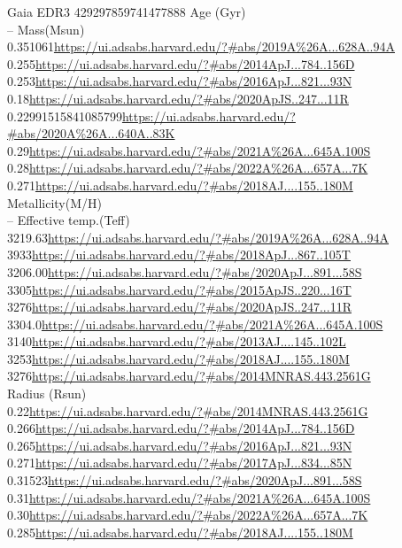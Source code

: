 Gaia EDR3 429297859741477888
Age (Gyr)\\
--
Mass(Msun)\\
0.351061\url{https://ui.adsabs.harvard.edu/?#abs/2019A%26A...628A..94A}\\
0.255\url{https://ui.adsabs.harvard.edu/?#abs/2014ApJ...784..156D}\\
0.253\url{https://ui.adsabs.harvard.edu/?#abs/2016ApJ...821...93N}\\
0.18\url{https://ui.adsabs.harvard.edu/?#abs/2020ApJS..247...11R}\\
0.22991515841085799\url{https://ui.adsabs.harvard.edu/?#abs/2020A%26A...640A..83K}\\
0.29\url{https://ui.adsabs.harvard.edu/?#abs/2021A%26A...645A.100S}\\
0.28\url{https://ui.adsabs.harvard.edu/?#abs/2022A%26A...657A...7K}\\
0.271\url{https://ui.adsabs.harvard.edu/?#abs/2018AJ....155..180M}\\
Metallicity(M/H)\\
--
Effective temp.(Teff)\\
3219.63\url{https://ui.adsabs.harvard.edu/?#abs/2019A%26A...628A..94A}\\
3933\url{https://ui.adsabs.harvard.edu/?#abs/2018ApJ...867..105T}\\
3206.00\url{https://ui.adsabs.harvard.edu/?#abs/2020ApJ...891...58S}\\
3305\url{https://ui.adsabs.harvard.edu/?#abs/2015ApJS..220...16T}\\
3276\url{https://ui.adsabs.harvard.edu/?#abs/2020ApJS..247...11R}\\
3304.0\url{https://ui.adsabs.harvard.edu/?#abs/2021A%26A...645A.100S}\\
3140\url{https://ui.adsabs.harvard.edu/?#abs/2013AJ....145..102L}\\
3253\url{https://ui.adsabs.harvard.edu/?#abs/2018AJ....155..180M}\\
3276\url{https://ui.adsabs.harvard.edu/?#abs/2014MNRAS.443.2561G}\\
Radius (Rsun)\\
0.22\url{https://ui.adsabs.harvard.edu/?#abs/2014MNRAS.443.2561G}\\
0.266\url{https://ui.adsabs.harvard.edu/?#abs/2014ApJ...784..156D}\\
0.265\url{https://ui.adsabs.harvard.edu/?#abs/2016ApJ...821...93N}\\
0.271\url{https://ui.adsabs.harvard.edu/?#abs/2017ApJ...834...85N}\\
0.31523\url{https://ui.adsabs.harvard.edu/?#abs/2020ApJ...891...58S}\\
0.31\url{https://ui.adsabs.harvard.edu/?#abs/2021A%26A...645A.100S}\\
0.30\url{https://ui.adsabs.harvard.edu/?#abs/2022A%26A...657A...7K}\\
0.285\url{https://ui.adsabs.harvard.edu/?#abs/2018AJ....155..180M}\\